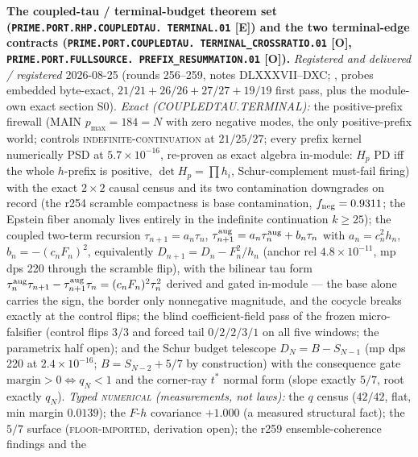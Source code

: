 \par\smallskip\noindent\textbf{The coupled-tau / terminal-budget
theorem set (\texttt{PRIME.PORT.RHP.COUPLEDTAU.\allowbreak
TERMINAL.01} [E]) and the two terminal-edge contracts
(\texttt{PRIME.PORT.COUPLEDTAU.\allowbreak
TERMINAL\_CROSSRATIO.01} [O],
\texttt{PRIME.PORT.FULLSOURCE.\allowbreak
PREFIX\_RESUMMATION.01} [O]).}
{\sloppy
\emph{Registered and delivered / registered} 2026-08-25 (rounds
256--259, notes DLXXXVII--DXC;
, probes embedded
byte-exact, $21/21 + 26/26 + 27/27 + 19/19$ first pass, plus the
module-own exact section S0).  \emph{Exact (COUPLEDTAU.TERMINAL):}
the positive-prefix firewall (MAIN $p_{\max} = 184 = N$ with zero
negative modes, the only positive-prefix world; controls
\textsc{indefinite-continuation} at $21/25/27$; every prefix
kernel numerically PSD at $5.7\times10^{-16}$, re-proven as exact
algebra in-module: $H_p$ PD iff the whole $h$-prefix is positive,
$\det H_p = \prod h_i$, Schur-complement must-fail firing) with
the exact $2\times2$ causal census and its two contamination
downgrades on record (the r254 scramble compactness is base
contamination, $f_{\rm neg} = 0.9311$; the Epstein fiber anomaly
lives entirely in the indefinite continuation $k \ge 25$); the
coupled two-term recursion $\tau_{n+1} = a_n\tau_n$,
$\tau^{\rm aug}_{n+1} = a_n\tau^{\rm aug}_n + b_n\tau_n$ with
$a_n = c_n^2h_n$, $b_n = -(c_nF_n)^2$, equivalently $D_{n+1} =
D_n - F_n^2/h_n$ (anchor rel $4.8\times10^{-11}$, mp dps 220
through the scramble flip), with the bilinear tau form
$\tau^{\rm aug}_n\tau_{n+1} - \tau^{\rm aug}_{n+1}\tau_n =
(c_nF_n)^2\tau_n^2$ derived and gated in-module --- the base
alone carries the sign, the border only nonnegative magnitude,
and the cocycle breaks exactly at the control flips; the blind
coefficient-field pass of the frozen micro-falsifier (control
flips $3/3$ and forced tail $0/2/2/3/1$ on all five windows; the
parametrix half open); and the Schur budget telescope $D_N = B -
S_{N-1}$ (mp dps 220 at $2.4\times10^{-16}$; $B = S_{N-2} + 5/7$
by construction) with the consequence gate $\text{margin} > 0
\iff q_N < 1$ and the corner-ray $t^*$ normal form (slope exactly
$5/7$, root exactly $q_N$).  \emph{Typed \textsc{numerical}
(measurements, not laws):} the $q$ census ($42/42$, flat, min
margin $0.0139$); the $F$-$h$ covariance $+1.000$ (a measured
structural fact); the $5/7$ surface (\textsc{floor-imported},
derivation open); the r259 ensemble-coherence findings and the
}
